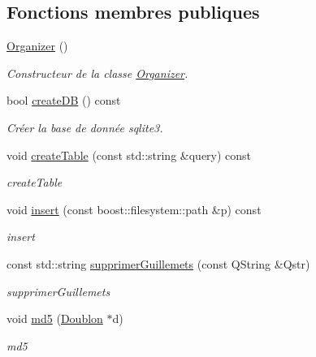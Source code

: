 \subsection*{Fonctions membres publiques}
\begin{DoxyCompactItemize}
\item 
\hypertarget{class_organizer_a5eb7c1fc676db53752dc784136d878bd}{\hyperlink{class_organizer_a5eb7c1fc676db53752dc784136d878bd}{Organizer} ()}\label{class_organizer_a5eb7c1fc676db53752dc784136d878bd}

\begin{DoxyCompactList}\small\item\em Constructeur de la classe \hyperlink{class_organizer}{Organizer}. \end{DoxyCompactList}\item 
bool \hyperlink{class_organizer_aa0203d8ff56c2a2bc620f26b7f4acbe6}{create\-D\-B} () const 
\begin{DoxyCompactList}\small\item\em Créer la base de donnée sqlite3. \end{DoxyCompactList}\item 
void \hyperlink{class_organizer_a767df574ab8675f6c6caa72c8c0d1f77}{create\-Table} (const std\-::string \&query) const 
\begin{DoxyCompactList}\small\item\em create\-Table \end{DoxyCompactList}\item 
void \hyperlink{class_organizer_acdbfb38595b744a703f218c56b7cdd1b}{insert} (const boost\-::filesystem\-::path \&p) const 
\begin{DoxyCompactList}\small\item\em insert \end{DoxyCompactList}\item 
const std\-::string \hyperlink{class_organizer_a51829ddab54c6f52acd31ee752dcf30c}{supprimer\-Guillemets} (const Q\-String \&Qstr)
\begin{DoxyCompactList}\small\item\em supprimer\-Guillemets \end{DoxyCompactList}\item 
void \hyperlink{class_organizer_a53f3e3bc13366e77e896ff590c7da7a4}{md5} (\hyperlink{class_doublon}{Doublon} $\ast$d)
\begin{DoxyCompactList}\small\item\em md5 \end{DoxyCompactList}\item 

\end{DoxyCompactItemize}
